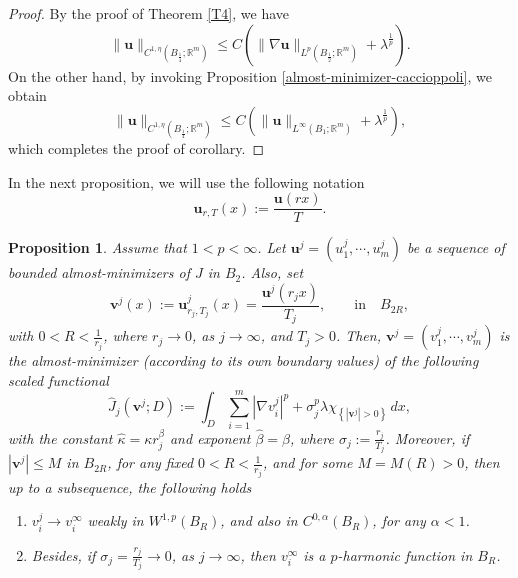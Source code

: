 \documentclass{amsart}
\newtheorem{proposition}[theorem]{Proposition}
\begin{document}
\begin{proof}
By the proof of Theorem \ref{T4}, we have 
$$ \|\mathbf{u} \|_{C^{1,\eta} (B_{\frac{1}{4}}; \mathbb{R}^m )} \leq C \left( 
\|\nabla \mathbf{u}\|_{L^{p} (B_{\frac{1}{2}}; \mathbb{R}^m )} + \lambda^{\frac{1}{p}} \right). 
$$
On the other hand, by invoking Proposition \ref{almost-minimizer-caccioppoli}, we obtain 
$$ \|\mathbf{u} \|_{C^{1,\eta} (B_{\frac{1}{4}}; \mathbb{R}^m )} \leq C \left( \|\mathbf{u}\|_{L^{\infty}(B_1; \mathbb{R}^m)} + \lambda^{\frac{1}{p}} \right), $$
which completes the 
 proof of corollary.
\end{proof}



In the next proposition, we will use the following notation
$$ \mathbf{u}_{r,T} (x):= \frac{\mathbf{u}(rx)}{T}. $$


\begin{proposition}
\label{LConverg}
Assume that $1<p<\infty$. Let $\mathbf{u}^j= \left(u^j_1, \cdots, u^j_m \right)$ be a sequence of bounded almost-minimizers of $J$ in $B_2$. 
Also, set 
$$
\mathbf{v}^j(x):=\mathbf{u}^j_{r_j, T_j} (x)= \frac{\mathbf{u}^j(r_jx)}{T_j}, \qquad \text{in} \quad B_{2R},
$$
with $0<R<\frac{1}{r_j}$, where $r_j \to 0$, as $j \to \infty$, and $T_j >0$. 
Then, $\mathbf{v}^j= \left(v_1^j, \cdots,v_m^j \right)$ is the almost-minimizer (according to its own boundary values) of the following scaled functional
$$ \hat{J}_j \left(\mathbf{v}^j; D \right):=\int_{D} 
 \sum_{i=1}^{m} \left|\nabla v_i^j \right|^p + \sigma_j^p  \lambda \chi_{\left\{\left|\mathbf{v}^j \right|>0 \right\}} \, dx,
$$
with the constant $\hat{\kappa}= \kappa r_j^{\beta} $ and exponent $\hat{\beta}=\beta$, where  $\sigma_j:=\frac{r_j}{T_j}$.
Moreover, if $\left|\mathbf{v}^j \right| \leq M$ in $B_{2R}$, for any fixed $0<R<\frac{1}{r_j}$, and for some $M=M(R)>0$, then up to a subsequence, the following holds  
\begin{enumerate}
\item [(i)]
$v_i^j \to v_i^{\infty}$ weakly in $W^{1,p}(B_R)$, and also in $C^{0,\alpha}(B_R)$, for any $\alpha<1$.
\item [(ii)]
Besides, if $\sigma_j =\frac{r_j}{T_j} \to 0$, as $j \to  \infty$, then $v_i^{\infty}$ is a $p$-harmonic function in $B_R$.
\end{enumerate}
\end{proposition}
\end{document}

